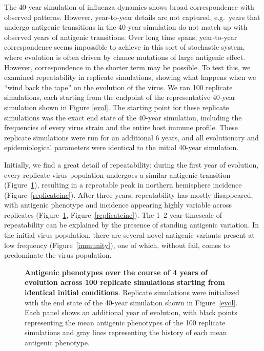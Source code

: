 \documentclass[11pt,oneside,letterpaper]{article}
\begin{document}
The 40-year simulation of influenza dynamics shows broad correspondence with observed patterns. However, year-to-year details are not captured, e.g.\ years that undergo antigenic transitions in the 40-year simulation do not match up with observed years of antigenic transitions.  Over long time spans, year-to-year correspondence seems impossible to achieve in this sort of stochastic system, where evolution is often driven by chance mutations of large antigenic effect.  However, correspondence in the shorter term may be possible.  To test this, we examined repeatability in replicate simulations, showing what happens when we ``wind back the tape'' \cite{GouldWonderfulLife} on the evolution of the virus.  We ran 100 replicate simulations, each starting from the endpoint of the representative 40-year simulation shown in Figure \ref{evol}.  The starting point for these replicate simulations was the exact end state of the 40-year simulation, including the frequencies of every virus strain and the entire host immune profile.  These replicate simulations were run for an additional 6 years, and all evolutionary and epidemiological parameters were identical to the initial 40-year simulation.  

Initially, we find a great detail of repeatability; during the first year of evolution, every replicate virus population undergoes a similar antigenic transition (Figure~\ref{replicateevol}), resulting in a repeatable peak in northern hemisphere incidence (Figure~\ref{replicateinc}).  After three years, repeatability has mostly disappeared, with antigenic phenotype and incidence appearing highly variable across replicates (Figure~\ref{replicateevol}, Figure~\ref{replicateinc}).  The 1--2 year timescale of repeatability can be explained by the presence of standing antigenic variation.  In the initial virus population, there are several novel antigenic variants present at low frequency (Figure~\ref{immunity}), one of which, without fail, comes to predominate the virus population.  

\begin{figure}[tb]
	\centering
	\caption{\textbf{Antigenic phenotypes over the course of 4 years of evolution across 100 replicate simulations starting from identical initial conditions}.  Replicate simulations were initialized with the end state of the  40-year simulation shown in Figure~\ref{evol}.  Each panel shows an additional year of evolution, with black points representing the mean antigenic phenotypes of the 100 replicate simulations and gray lines representing the history of each mean antigenic phenotype.}
	\label{replicateevol}
\end{figure}
\end{document}
